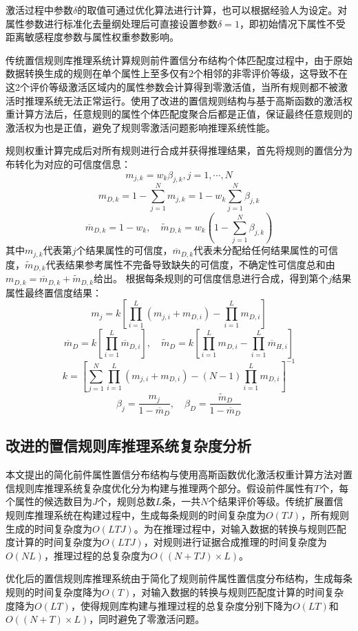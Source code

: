 \documentclass{cjc}
\begin{document}
激活过程中参数$\delta$的取值可通过优化算法进行计算，也可以根据经验人为设定。对属性参数进行标准化去量纲处理后可直接设置参数$\delta=1$，即初始情况下属性不受距离敏感程度参数与属性权重参数影响。

传统置信规则库推理系统计算规则前件置信分布结构个体匹配度过程中，由于原始数据转换生成的规则在单个属性上至多仅有2个相邻的非零评价等级，这导致不在这2个评价等级激活区域内的属性参数会计算得到零激活值，当所有规则都不被激活时推理系统无法正常运行。使用了改进的置信规则结构与基于高斯函数的激活权重计算方法后，任意规则的属性个体匹配度聚合后都是正值，保证最终任意规则的激活权为也是正值，避免了规则零激活问题影响推理系统性能。

规则权重计算完成后对所有规则进行合成并获得推理结果，首先将规则的置信分为布转化为对应的可信度信息：
$$m_{j,k}=w_k\beta_{j,k},j=1,\cdots,N$$
$$m_{D,k}=1-\sum_{j=1}^Nm_{j,k}=1-w_k\sum_{j=1}^{N}\beta_{j,k}$$
$$\overline{m}_{D,k}=1-w_k,\quad\widetilde{m}_{D,k}=w_k(1-\sum_{j=1}^N\beta_{j,k})$$
其中$m_{j,k}$代表第$j$个结果属性的可信度，$\overline{m}_{D,k}$代表未分配给任何结果属性的可信度，$\widetilde{m}_{D,k}$代表结果参考属性不完备导致缺失的可信度，不确定性可信度总和由$m_{D,k}=\overline{m}_{D,k}+\widetilde{m}_{D,k}$给出。
根据每条规则的可信度信息进行合成，得到第个$j$结果属性最终置信度结果：
$$m_j=k[\prod_{i=1}^L(m_{j,i}+m_{D,i})-\prod_{i=1}^Lm_{D,i}]$$
$$\overline{m}_D=k[\prod_{i=1}^L\overline{m}_{D,i}],\quad\widetilde{m}_D=k[\prod_{i=1}^Lm_{D,i}-\prod_{i=1}^L\overline{m}_{H,i}]$$
$$k=[\sum_{j=1}^N\prod_{i=1}^L(m_{j,i}+m_{D,i})-(N-1)\prod_{i=1}^Lm_{D,i}]^{-1}$$
$$\beta_j=\frac{m_j}{1-\overline{m}_D},\quad\beta_D=\frac{\widetilde{m}_D}{1-\overline{m}_D}$$
\subsection{改进的置信规则库推理系统复杂度分析}
本文提出的简化前件属性置信分布结构与使用高斯函数优化激活权重计算方法对置信规则库推理系统复杂度优化分为构建与推理两个部分。假设前件属性有$T$个，每个属性的候选数目为$J$个，规则总数$L$条，一共$N$个结果评价等级。传统扩展置信规则库推理系统在构建过程中，生成每条规则的时间复杂度为$O(TJ)$，所有规则生成的时间复杂度为$O(LTJ)$。为在推理过程中，对输入数据的转换与规则匹配度计算的时间复杂度为$O(LTJ)$，对规则进行证据合成推理的时间复杂度为$O(NL)$，推理过程的总复杂度为$O((N+TJ)\times L)$。

优化后的置信规则库推理系统由于简化了规则前件属性置信度分布结构，生成每条规则的时间复杂度降为$O(T)$，对输入数据的转换与规则匹配度计算的时间复杂度降为$O(LT)$，使得规则库构建与推理过程的总复杂度分别下降为$O(LT)$和$O((N+T)\times L)$，同时避免了零激活问题。
\end{document}
